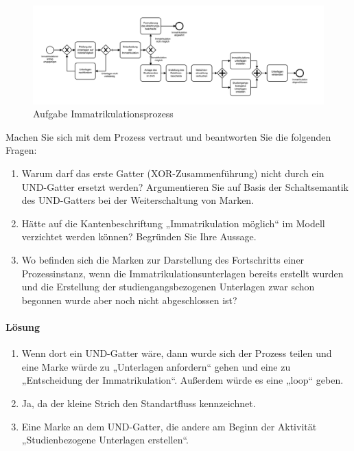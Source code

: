         \begin{figure}[h]
            \centering
            \includegraphics[width=\textwidth]{image/Aufgabe_6_1.png}
            \caption{Aufgabe Immatrikulationsprozess}
            \label{fig:Aufgabe_6_1}
        \end{figure}

        Machen Sie sich mit dem Prozess vertraut und beantworten Sie die folgenden Fragen:

        \begin{enumerate}[label=\alph*)]
            \item Warum darf das erste Gatter (XOR-Zusammenführung) nicht durch ein UND-Gatter ersetzt werden? Argumentieren Sie auf Basis der Schaltsemantik des UND-Gatters bei der Weiterschaltung von Marken.
            \item Hätte auf die Kantenbeschriftung „Immatrikulation möglich“ im Modell verzichtet werden können? Begründen Sie Ihre Aussage.
            \item Wo befinden sich die Marken zur Darstellung des Fortschritts einer Prozessinstanz, wenn die Immatrikulationsunterlagen bereits erstellt wurden und die Erstellung der studiengangsbezogenen Unterlagen zwar schon begonnen wurde aber noch nicht abgeschlossen ist?
        \end{enumerate}

    \paragraph*{Lösung}
        \begin{enumerate}[label=\alph*)]
            \item Wenn dort ein UND-Gatter wäre, dann wurde sich der Prozess teilen und eine Marke würde zu „Unterlagen anfordern“ gehen und eine zu „Entscheidung der Immatrikulation“. Außerdem würde es eine „loop“ geben.
            \item Ja, da der kleine Strich den Standartfluss kennzeichnet.
            \item Eine Marke an dem UND-Gatter, die andere am Beginn der Aktivität „Studienbezogene Unterlagen erstellen“.
        \end{enumerate}

